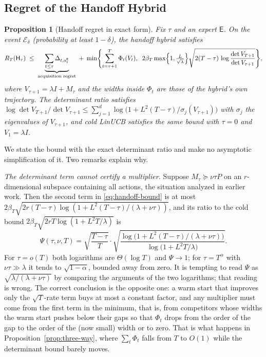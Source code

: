\documentclass{article}
\newtheorem{proposition}{Proposition}
\theoremstyle{definition}
\theoremstyle{remark}
\theoremstyle{remark}
\newcommand{\Exp}{\mathsf{E}}
\newcommand{\Hyb}{\mathsf{H}}
\begin{document}
\subsection{Regret of the Handoff Hybrid}
\label{sec:handoff}

\begin{proposition}[Handoff regret in exact form]
\label{thm:handoff}
Fix $\tau$ and an expert $\Exp$. On the event $\mathcal E_\delta$ (probability
at least $1-\delta$), the handoff hybrid satisfies
\begin{equation}
\label{eq:handoff-bound}
R_T(\Hyb_\tau)\;\le\;
\underbrace{\sum_{t\le\tau}\Delta_{t,a_t^{\Exp}}}_{\text{acquisition regret}}
\;+\;
\min\Biggl\{\sum_{t=\tau+1}^{T}\Phi_t(V_t),\;\;
2\beta_T\max\Bigl\{1,\tfrac{L}{\sqrt\lambda}\Bigr\}\sqrt{2(T-\tau)\,\log\frac{\det V_{T+1}}{\det V_{\tau+1}}}\Biggr\},
\end{equation}
where $V_{\tau+1}=\lambda I+M_\tau$ and the widths inside $\Phi_t$ are those
of the hybrid's own trajectory. The determinant ratio satisfies
$\log\det V_{T+1}/\det V_{\tau+1}\le\sum_{j=1}^{d}\log\bigl(1+L^2(T-\tau)/\sigma_j(V_{\tau+1})\bigr)$
with $\sigma_j$ the eigenvalues of $V_{\tau+1}$, and cold LinUCB satisfies the
same bound with $\tau=0$ and $V_1=\lambda I$.
\end{proposition}

We state the bound with the exact determinant ratio and make no asymptotic
simplification of it. Two remarks explain why.

\emph{The determinant term cannot certify a multiplier.} Suppose
$M_\tau\succeq\nu\tau P$ on an $r$-dimensional subspace containing all actions,
the situation analyzed in earlier work. Then the second term in
\eqref{eq:handoff-bound} is at most
$2\beta_T\sqrt{2r(T-\tau)\log(1+L^2(T-\tau)/(\lambda+\nu\tau))}$, and its ratio
to the cold bound $2\beta_T\sqrt{2rT\log(1+L^2T/\lambda)}$ is
\[
\Psi(\tau,\nu,T)=\sqrt{\frac{T-\tau}{T}}\cdot\sqrt{\frac{\log\bigl(1+L^2(T-\tau)/(\lambda+\nu\tau)\bigr)}{\log\bigl(1+L^2T/\lambda\bigr)}}.
\]
For $\tau=o(T)$ both logarithms are $\Theta(\log T)$ and $\Psi\to1$; for
$\tau=T^{\alpha}$ with $\nu\tau\gg\lambda$ it tends to $\sqrt{1-\alpha}$, bounded
away from zero. It is tempting to read $\Psi$ as
$\sqrt{\lambda/(\lambda+\nu\tau)}$ by comparing the arguments of the two
logarithms; that reading is wrong. The correct conclusion is the opposite
one: a warm start that improves only the $\sqrt{T}$-rate term buys at most a
constant factor, and any multiplier must come from the first term in the
minimum, that is, from competitors whose widths the warm start pushes below
their gaps so that $\Phi_t$ drops from the order of the gap to the order of
the (now small) width or to zero. That is what happens in
Proposition~\ref{prop:three-way}, where $\sum_t\Phi_t$ falls from $T$ to $O(1)$
while the determinant bound barely moves.
\end{document}
